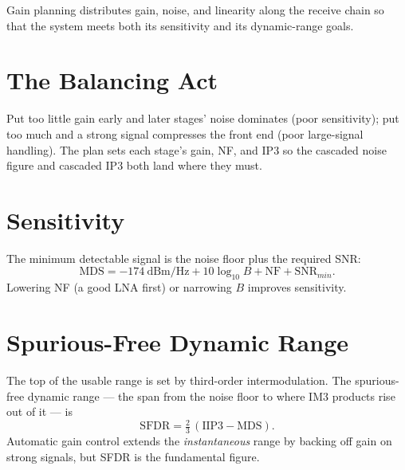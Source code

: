 Gain planning distributes gain, noise, and linearity along the receive chain so
that the system meets both its sensitivity and its dynamic-range goals.

\section{The Balancing Act}
Put too little gain early and later stages' noise dominates (poor sensitivity);
put too much and a strong signal compresses the front end (poor large-signal
handling). The plan sets each stage's gain, NF, and IP3 so the cascaded noise
figure and cascaded IP3 both land where they must.

\section{Sensitivity}
The minimum detectable signal is the noise floor plus the required SNR:
\[ \text{MDS} = -174\ \text{dBm/Hz} + 10\log_{10}B + \text{NF} + \text{SNR}_{min}. \]
Lowering NF (a good LNA first) or narrowing $B$ improves sensitivity.

\section{Spurious-Free Dynamic Range}
The top of the usable range is set by third-order intermodulation. The
spurious-free dynamic range --- the span from the noise floor to where IM3
products rise out of it --- is
\[ \text{SFDR} = \tfrac{2}{3}\,(\text{IIP3} - \text{MDS}). \]
Automatic gain control extends the \emph{instantaneous} range by backing off gain
on strong signals, but SFDR is the fundamental figure.
